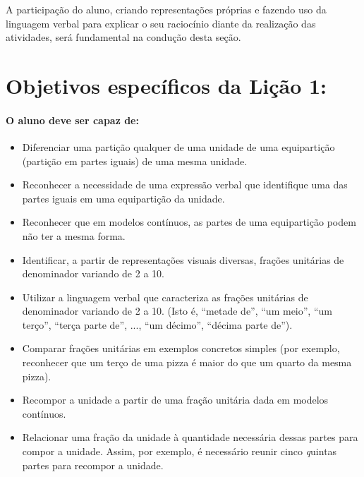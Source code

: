 A participação do aluno, criando representações próprias e fazendo uso da linguagem verbal para explicar o seu raciocínio diante da realização das atividades, será fundamental na condução desta seção.

\section{Objetivos específicos da Lição 1:}

\paragraph{O aluno deve ser capaz de:}

\begin{itemize}
\item  Diferenciar uma partição qualquer de uma unidade de uma equipartição (partição em partes iguais) de uma mesma unidade.
\item Reconhecer a necessidade de uma expressão verbal que identifique uma das partes iguais em uma equipartição da unidade.
\item  Reconhecer que em modelos contínuos, as partes de uma equipartição podem não ter a mesma forma.
\item  Identificar, a partir de representações visuais diversas, frações unitárias de denominador variando de 2 a 10.
\item  Utilizar a linguagem verbal que caracteriza as frações unitárias de denominador variando de 2 a 10. (Isto é, ``metade de'', ``um meio'', ``um terço'', ``terça parte de'', ..., ``um décimo'', ``décima parte de'').
\item  Comparar frações unitárias em exemplos concretos simples (por exemplo, reconhecer que um terço de uma pizza é maior do que um quarto da mesma pizza).
\item  Recompor a unidade a partir de uma fração unitária dada em modelos contínuos.
\item  Relacionar uma fração da unidade à quantidade necessária dessas partes para compor a unidade. Assim, por exemplo, é necessário reunir cinco {\textit quintas partes} para recompor a unidade.
\end{itemize}

